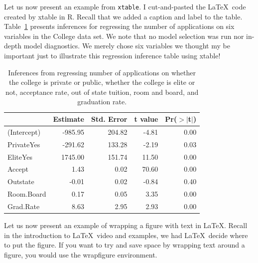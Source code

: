 \documentclass{article}\usepackage[]{graphicx}\usepackage[]{color}
\begin{document}
\newpage
Let us now present an example from {\tt xtable}.  I cut-and-pasted the \LaTeX\ code created by xtable in R.  Recall that we added a caption and label to the table.  Table~\ref{reginf} presents inferences for regressing the number of applications on six variables in the College data set.  We note that no model selection was run nor in-depth model diagnostics.  We merely chose six variables we thought my be important just to illustrate this regression inference table using xtable!
\begin{table}[ht]
\centering
\begin{tabular}{|l|rrrr|}
  \hline
 & Estimate & Std. Error & t value & Pr($>$$|$t$|$) \\ 
  \hline
(Intercept) & -985.95 & 204.82 & -4.81 & 0.00 \\ 
  PrivateYes & -291.62 & 133.28 & -2.19 & 0.03 \\ 
  EliteYes & 1745.00 & 151.74 & 11.50 & 0.00 \\ 
  Accept & 1.43 & 0.02 & 70.60 & 0.00 \\ 
  Outstate & -0.01 & 0.02 & -0.84 & 0.40 \\ 
  Room.Board & 0.17 & 0.05 & 3.35 & 0.00 \\ 
  Grad.Rate & 8.63 & 2.95 & 2.93 & 0.00 \\ 
   \hline
\end{tabular}
\caption{Inferences from regressing number of applications on whether the college is private or public,
                  whether the college is elite or not, acceptance rate, out of state tuition, room and board, and 
                  graduation rate.} 
\label{reginf}
\end{table}


\newpage
Let us now present an example of wrapping a figure with text in \LaTeX.  Recall in the introduction to \LaTeX\ video and examples, we had \LaTeX\ decide where to put the figure.  If you want to try and save space by wrapping text around a figure, you would use the wrapfigure environment.
\end{document}
